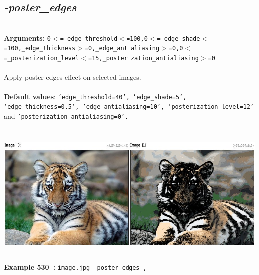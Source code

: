 \documentclass[a4paper,11pt,twoside]{book}
\begin{document}
\subsection{\emph{-poster\_edges} }\vspace*{-0.5em}
~\\\textbf{Arguments: } 
{\small \texttt{0$<$=\_edge\_threshold$<$=100,0$<$=\_edge\_shade$<$=100,\_edge\_thickness$>$=0,\_edge\_antialiasing$>$=0,0$<$=\_posterization\_level$<$=15,\_posterization\_antialiasing$>$=0}}\\~\\
Apply poster edges effect on selected images.
~\\~\\\textbf{Default values}: {\small \texttt{'edge\_threshold=40', 'edge\_shade=5', 'edge\_thickness=0.5', 'edge\_antialiasing=10', 'posterization\_level=12'} and \texttt{'posterization\_antialiasing=0'.}}
\begin{center}\includegraphics[keepaspectratio=true,height=7cm,width=\textwidth]{img/gmic_def530.jpg}\\
{\footnotesize \textbf{Example 530~:} \texttt{image.jpg --poster\_edges ,}}
\end{center}
\end{document}
